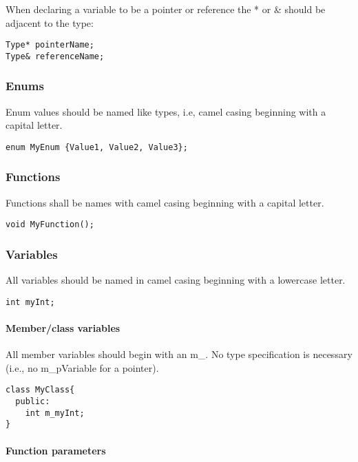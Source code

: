 \documentclass[12pt]{article}
\begin{document}
When declaring a variable to be a pointer or reference the * or \& should be
adjacent to the type:

\begin{lstlisting}
Type* pointerName;
Type& referenceName;
\end{lstlisting}

\subsubsection{Enums}
Enum values should be named like types, i.e, camel casing beginning with a
capital letter.

\begin{lstlisting}
enum MyEnum {Value1, Value2, Value3};
\end{lstlisting}

\subsubsection{Functions}
Functions shall be names with camel casing beginning with a capital letter.

\begin{lstlisting}
void MyFunction();
\end{lstlisting}

\subsubsection{Variables}

All variables should be named in camel casing beginning with a lowercase letter.

\begin{lstlisting}
int myInt;
\end{lstlisting}

\paragraph{Member/class variables}

All member variables should begin with an m\_. No type specification is
necessary (i.e., no m\_pVariable for a pointer).


\begin{lstlisting}
class MyClass{
  public:
    int m_myInt;
}
\end{lstlisting}

\paragraph{Function parameters}
\end{document}
